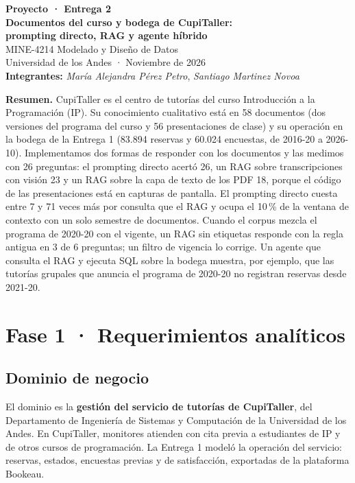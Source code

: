 \documentclass[11pt,letterpaper]{article}
\begin{document}
\begin{center}
{\Large\bfseries Proyecto · Entrega 2\\[2pt] Documentos del curso y bodega de CupiTaller:\\ prompting directo, RAG y agente híbrido}\\[8pt]
MINE-4214 Modelado y Diseño de Datos\\
Universidad de los Andes · Noviembre de 2026\\[6pt]
\textbf{Integrantes:} \emph{María Alejandra Pérez Petro}, \emph{Santiago Martinez Novoa}
\end{center}

\textbf{Resumen.} CupiTaller es el centro de tutorías del curso Introducción a la Programación (IP). Su conocimiento cualitativo está en 58 documentos (dos versiones del programa del curso y 56 presentaciones de clase) y su operación en la bodega de la Entrega 1 (83.894 reservas y 60.024 encuestas, de 2016-20 a 2026-10). Implementamos dos formas de responder con los documentos y las medimos con 26 preguntas: el prompting directo acertó 26, un RAG sobre transcripciones con visión 23 y un RAG sobre la capa de texto de los PDF 18, porque el código de las presentaciones está en capturas de pantalla. El prompting directo cuesta entre 7 y 71 veces más por consulta que el RAG y ocupa el 10\,\% de la ventana de contexto con un solo semestre de documentos. Cuando el corpus mezcla el programa de 2020-20 con el vigente, un RAG sin etiquetas responde con la regla antigua en 3 de 6 preguntas; un filtro de vigencia lo corrige. Un agente que consulta el RAG y ejecuta SQL sobre la bodega muestra, por ejemplo, que las tutorías grupales que anuncia el programa de 2020-20 no registran reservas desde 2021-20.

\tableofcontents
\bigskip

\section{Fase 1 · Requerimientos analíticos}

\subsection{Dominio de negocio}

El dominio es la \textbf{gestión del servicio de tutorías de CupiTaller}, del Departamento de Ingeniería de Sistemas y Computación de la Universidad de los Andes. En CupiTaller, monitores atienden con cita previa a estudiantes de IP y de otros cursos de programación. La Entrega 1 modeló la operación del servicio: reservas, estados, encuestas previas y de satisfacción, exportadas de la plataforma Bookeau.
\end{document}
